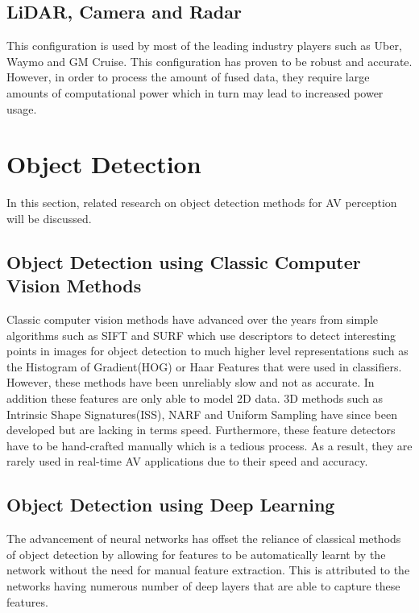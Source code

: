 \subsection{LiDAR, Camera and Radar}
This configuration is used by most of the leading industry players such as Uber, Waymo and GM Cruise. This configuration has proven to be robust and accurate. However, in order to process the amount of fused data, they require large amounts of computational power which in turn may lead to increased power usage. 


\section{Object  Detection} 
In this section, related research on object detection methods for AV perception will be discussed. 




\subsection{Object Detection using Classic Computer Vision Methods}
Classic computer vision methods have advanced over the years from simple algorithms such as SIFT\cite{lowe1999object} and SURF\cite{bay2006surf} which use descriptors to detect interesting points in images for object detection to much higher level representations such as the Histogram of Gradient(HOG)\cite{dalal2005histograms} or Haar Features\cite{viola2001rapid}  that were used in classifiers.  However, these methods have been unreliably slow and not as accurate. In addition these features are only able to model 2D data. 3D methods such as Intrinsic Shape Signatures(ISS)\cite{}, NARF\cite{} and Uniform Sampling have since been developed but are lacking in terms speed. Furthermore, these feature detectors have to be hand-crafted manually which is a tedious process. As a result, they are rarely used in real-time AV applications due to their speed and accuracy.


\subsection{Object Detection using Deep Learning}
The advancement of neural networks has offset the reliance of classical methods of object detection by allowing for features to be automatically learnt by the network without the need for manual feature extraction. This is attributed to the networks having numerous number of deep layers that are able to capture these features.  
